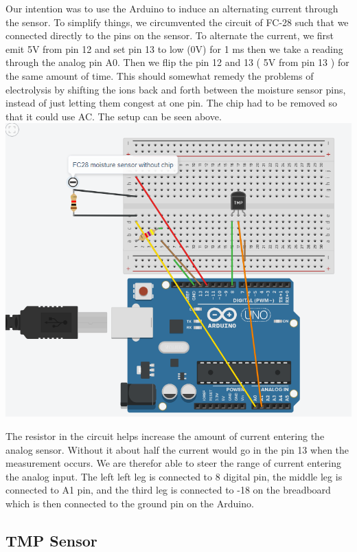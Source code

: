 \documentclass{article}
\begin{document}
Our intention was to use the Arduino to induce an alternating current through the sensor. To simplify things, we circumvented the circuit of FC-28 such that we connected directly to the pins on the sensor. To alternate the current, we first emit 5V from pin 12 and set pin 13 to low (0V) for 1 ms then we take a reading through the analog pin A0. Then we flip the pin 12 and 13 ( 5V from pin 13 ) for the same amount of time. This should somewhat remedy the problems of electrolysis by shifting the ions back and forth between the moisture sensor pins, instead of just letting them congest at one pin. The chip had to be removed so that it could use AC.
The setup can be seen above.
\includegraphics[scale = 0.50]{FC-28-Diagram.PNG}


The resistor in the circuit helps increase the amount of current entering the analog sensor. Without it about half the current would go in the pin 13 when the measurement occurs. We are therefor able to steer the range of current entering the analog input. The left left leg is connected to 8 digital pin, the middle leg is connected to A1 pin, and the third leg is connected to -18 on the breadboard which is then connected to the ground pin on the Arduino.  


\subsection{TMP Sensor}
\end{document}
